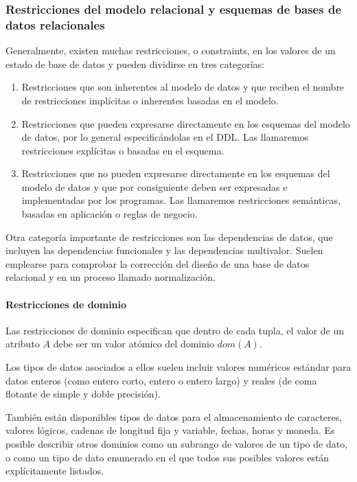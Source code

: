 \subsubsection{Restricciones del modelo relacional y esquemas de bases de datos relacionales}
Generalmente, existen muchas restricciones, o constraints, en los valores de un estado de base de datos y pueden dividirse en tres categorías:
\begin{enumerate}
    \item Restricciones que son inherentes al modelo de datos y que reciben el nombre de restricciones implícitas o inherentes basadas en el modelo.
    \item Restricciones que pueden expresarse directamente en los esquemas del modelo de datos, por lo general especificándolas en el DDL. Las llamaremos restricciones explícitas o basadas en el esquema.
    \item Restricciones que no pueden expresarse directamente en los esquemas del modelo de datos y que
    por consiguiente deben ser expresadas e implementadas por los programas. Las llamaremos restricciones semánticas, basadas en aplicación o reglas de negocio.
\end{enumerate}


Otra categoría importante de restricciones son las dependencias de datos, que incluyen las dependencias funcionales y las dependencias multivalor. Suelen emplearse para comprobar la corrección del diseño de una base de datos relacional y en un proceso llamado normalización.


\paragraph{Restricciones de dominio}
Las restricciones de dominio especifican que dentro de cada tupla, el valor de un atributo $A$ debe ser un valor atómico del dominio $dom(A)$. 


Los tipos de datos asociados a ellos suelen incluir valores numéricos estándar para datos enteros (como entero corto, entero o entero largo) y reales (de coma flotante de simple y doble precisión).


También están disponibles tipos de datos para el almacenamiento de caracteres, valores lógicos, cadenas de longitud fija y variable, fechas, horas y moneda. Es posible describir otros dominios como un subrango de valores de un tipo de dato, o como un tipo de dato enumerado en el que todos sus posibles valores están explícitamente listados.



